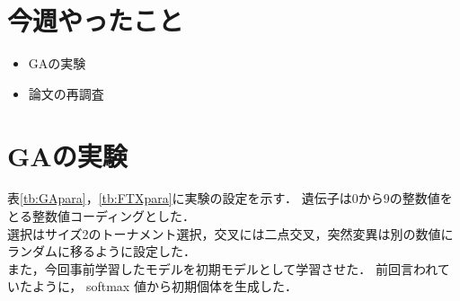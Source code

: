 \documentclass[twocolumn]{jarticle}     %
\begin{document}


\section{今週やったこと}

\begin{itemize}
	\item GAの実験
	\item 論文の再調査
\end{itemize}

\section{GAの実験}
表\ref{tb:GApara}，\ref{tb:FTXpara}に実験の設定を示す．
遺伝子は0から9の整数値をとる整数値コーディングとした．\\
選択はサイズ2のトーナメント選択，交叉には二点交叉，突然変異は別の数値にランダムに移るように設定した．\\
また，今回事前学習したモデルを初期モデルとして学習させた．
前回言われていたように， softmax 値から初期個体を生成した．

\begin{table}[h]
	\centering
	\caption{GAの設定\label{tb:GApara}}
\end{table}
\end{document}
